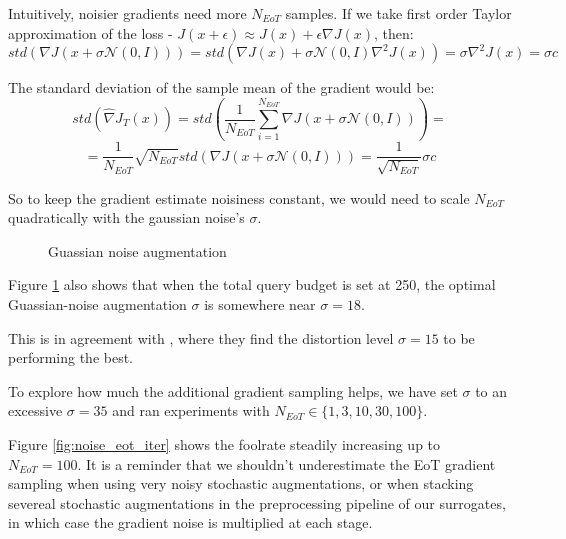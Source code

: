 Intuitively, noisier gradients need more $N_{EoT}$ samples. If we take first order Taylor approximation of the loss - $J(x + \epsilon) \approx J(x) + \epsilon \nabla J(x)$, then:
$$std(\nabla J(x + \sigma \mathcal{N}(0, I))) = std(\nabla J(x) + \sigma  \mathcal{N}(0, I) \nabla^2 J(x)) = \sigma \nabla^2 J(x) = \sigma c$$

The standard deviation of the sample mean of the gradient would be:
$$std(\widehat{\nabla} J_{T}(x)) = std(\frac{1}{N_{EoT}} \sum_{i=1}^{N_{EoT}} \nabla J(x + \sigma \mathcal{N}(0, I)))=$$
$$ = \frac{1}{N_{EoT}} \sqrt{N_{EoT}} std(\nabla J(x + \sigma \mathcal{N}(0, I))) = \frac{1}{\sqrt{N_{EoT}}} \sigma c $$

So to keep the gradient estimate noisiness constant, we would need to scale $N_{EoT}$ quadratically with the gaussian noise's $\sigma$.

\begin{figure}
\centering

\caption{Guassian noise augmentation}
\label{fig:apgd_noise_augment}
\end{figure}


Figure \ref{fig:apgd_noise_augment} also shows that when the total query budget is set at 250, the optimal Guassian-noise augmentation $\sigma$ is somewhere near $\sigma=18$. 



This is in agreement with \cite{Wu2020TowardsUA}, where they find the distortion level $\sigma = 15$ to be performing the best.


To explore how much the additional gradient sampling helps, we have set $\sigma$ to an excessive $\sigma=35$ and ran experiments with $N_{EoT} \in \{1, 3, 10, 30, 100\}$.

Figure \ref{fig:noise_eot_iter} shows the foolrate steadily increasing up to $N_{EoT} = 100$. It is a reminder that we shouldn't underestimate the EoT gradient sampling when using very noisy stochastic augmentations, or when stacking severeal stochastic augmentations in the preprocessing pipeline of our surrogates, in which case the gradient noise is multiplied at each stage.


